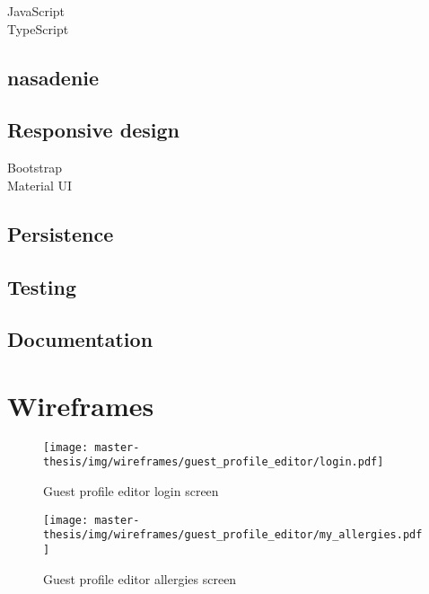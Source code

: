 \begin{description}
  \item[JavaScript] 
  \item[TypeScript] 
\end{description}


\subsection{nasadenie}

\subsection{Responsive design}
\begin{description}
  \item[Bootstrap] 
  \item[Material UI] 
\end{description}

\subsection{Persistence}

\subsection{Testing}

\subsection{Documentation}

\section{Wireframes}
\begin{figure}[h]
  \centering
  \texttt{[image: master-thesis/img/wireframes/guest\_profile\_editor/login.pdf]}
  \caption{Guest profile editor login screen}
\end{figure}

\begin{figure}[h]
  \centering
  \texttt{[image: master-thesis/img/wireframes/guest\_profile\_editor/my\_allergies.pdf]}
  \caption{Guest profile editor allergies screen}
\end{figure}

